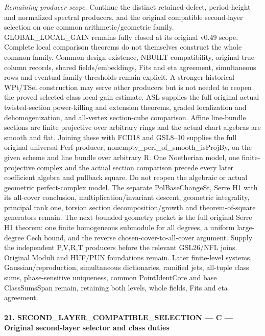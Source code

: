 \emph{Remaining producer scope.} Continue the distinct retained-defect, period-height and normalized spectral producers, and the original compatible second-layer selection on one common arithmetic/geometric family. GLOBAL\_\allowbreak LOCAL\_\allowbreak GAIN remains fully closed at its original v0.49 scope. Complete local comparison theorems do not themselves construct the whole common family. Common design existence, NBUILT compatibility, original true-column records, shared fields/embeddings, Fits and eta agreement, simultaneous rows and eventual-family thresholds remain explicit. A stronger historical WPt/TSel construction may serve other producers but is not needed to reopen the proved selected-class local-gain estimate. ASL supplies the full original actual twisted-section power-killing and extension theorems, graded localization and dehomogenization, and all-vertex section-cube comparison. Affine line-bundle sections are finite projective over arbitrary rings and the actual chart algebras are smooth and flat. Joining these with FCD18 and GSL8–10 supplies the full original universal Perf producer, nonempty\_\allowbreak perf\_\allowbreak of\_\allowbreak smooth\_\allowbreak isProjBy, on the given scheme and line bundle over arbitrary R. One Noetherian model, one finite-projective complex and the actual section comparison precede every later coefficient algebra and pullback square. Do not reopen the algebraic or actual geometric perfect-complex model. The separate PolBaseChangeSt, Serre H1 with its all-cover conclusion, multiplication/invariant descent, geometric integrality, principal rank one, torsion section decomposition/growth and theorem-of-square generators remain. The next bounded geometry packet is the full original Serre H1 theorem: one finite homogeneous submodule for all degrees, a uniform large-degree Cech bound, and the reverse chosen-cover-to-all-cover argument. Supply the independent P,V,R,T producers before the relevant GSL26/NFL joins. Original Moduli and HUF/PUN foundations remain. Later finite-level systems, Gaussian/reproduction, simultaneous dictionaries, ramified jets, all-tuple class sums, phase-sensitive uniqueness, common PointIdentCore and base ClassSumsSpan remain, retaining both levels, whole fields, Fits and eta agreement.



\paragraph{21. SECOND\_\allowbreak LAYER\_\allowbreak COMPATIBLE\_\allowbreak SELECTION — C — Original second-layer selector and class duties}

